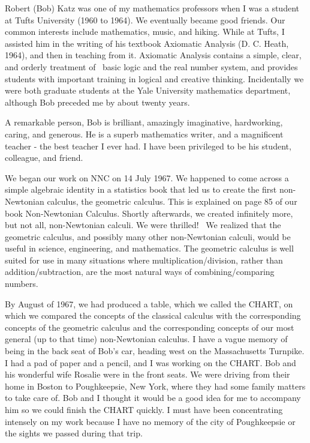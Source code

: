 \documentclass[12pt]{article}
\begin{document}
Robert (Bob) Katz was one of my mathematics professors when I was a student at Tufts University (1960 to 1964). We eventually became good friends. Our common interests include mathematics, music, and hiking. While at Tufts, I assisted him in the writing of his textbook Axiomatic Analysis (D. C. Heath, 1964), and then in teaching from it. Axiomatic Analysis contains a simple, clear, and orderly treatment of  basic logic and the real number system, and provides students with important training in logical and creative thinking. Incidentally we were both graduate students at the Yale University mathematics department, although Bob preceded me by about twenty years.

A remarkable person, Bob is brilliant, amazingly imaginative, hardworking, caring, and generous. He is a superb mathematics writer, and a magnificent teacher - the best teacher I ever had. I have been privileged to be his student, colleague, and friend.

We began our work  on NNC on 14 July 1967. We happened to come across a simple algebraic identity in a statistics book that led us to create the first non-Newtonian calculus, the geometric calculus. This is explained on page 85 of our book Non-Newtonian Calculus. Shortly afterwards, we created infinitely more, but not all, non-Newtonian calculi. We were thrilled!  We realized that the geometric calculus, and possibly many other non-Newtonian calculi, would be useful in science, engineering, and mathematics. The geometric calculus is well suited for use in many situations where multiplication/division, rather than addition/subtraction, are the most natural ways of combining/comparing numbers.

By August of 1967, we had produced a table, which we called the CHART, on which we compared the concepts of the classical calculus with the corresponding concepts of the geometric calculus and the corresponding concepts of our most general (up to that time) non-Newtonian calculus. I have a vague memory of being in the back seat of Bob's car, heading west on the Massachusetts Turnpike. I had a pad of paper and a pencil, and I was working on the CHART. Bob and his wonderful wife Rosalie were in the front seats. We were driving from their home in Boston to Poughkeepsie, New York, where they had some family matters to take care of. Bob and I thought it would be a good idea for me to accompany him so we could finish the CHART quickly. I must have been concentrating intensely on my work because I have no memory of the city of Poughkeepsie or the sights we passed during that trip.
\end{document}
